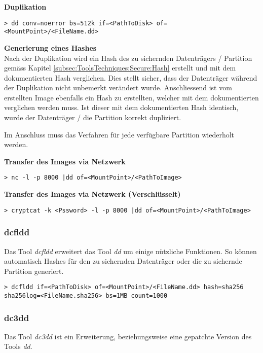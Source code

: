 \textbf{Duplikation}
\begin{lstlisting}
> dd conv=noerror bs=512k if=<PathToDisk> of=<MountPoint>/<FileName.dd>
\end{lstlisting}

\textbf{Generierung eines Hashes}\\
Nach der Duplikation wird ein Hash des zu sichernden Datenträgers / Partition gemäss Kapitel \ref{subsec:ToolsTechniques:Secure:Hash}  erstellt und mit dem dokumentierten Hash verglichen. Dies stellt sicher, dass der Datenträger während der Duplikation nicht unbemerkt verändert wurde. Anschliessend ist vom erstellten Image ebenfalls ein Hash zu erstellten, welcher mit dem dokumentierten verglichen werden muss. Ist dieser mit dem dokumentierten Hash identisch, wurde der Datenträger / die Partition korrekt dupliziert.

Im Anschluss muss das Verfahren für jede verfügbare Partition wiederholt werden.

\textbf{Transfer des Images via Netzwerk}
\begin{lstlisting}
> nc -l -p 8000 |dd of=<MountPoint>/<PathToImage>
\end{lstlisting}

\textbf{Transfer des Images via Netzwerk (Verschlüsselt)}
\begin{lstlisting}
> cryptcat -k <Pssword> -l -p 8000 |dd of=<MountPoint>/<PathToImage>
\end{lstlisting}

\subsubsection{dcfldd}
Das Tool \textit{dcfldd} erweitert das Tool \textit{dd} um einige nützliche Funktionen. So können automatisch Hashes für den zu sichernden Datenträger oder die zu sichernde Partition generiert.

\begin{lstlisting}
> dcfldd if=<PathToDisk> of=<MountPoint>/<FileName.dd> hash=sha256 sha256log=<FileName.sha256> bs=1MB count=1000
\end{lstlisting}


\subsubsection{dc3dd}
Das Tool \textit{dc3dd} ist ein Erweiterung, beziehungsweise eine gepatchte Version des Tools \textit{dd}.


